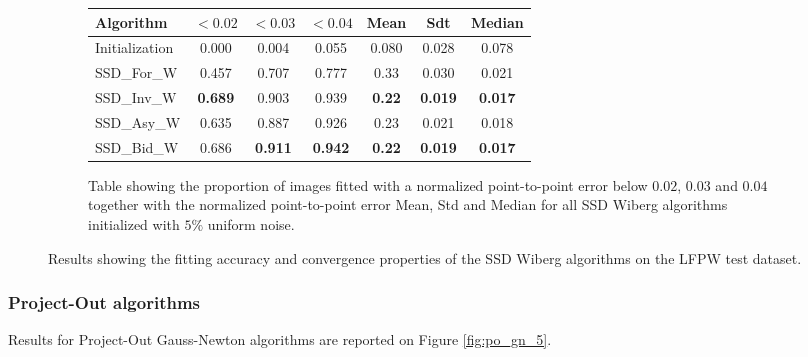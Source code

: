 \begin{figure}[p]
\begin{subfigure}{0.48\textwidth}
	    \label{fig:mean_cost_vs_iters2_ssd_w_5}
	\end{subfigure}
	\par\bigskip\bigskip
	\begin{subfigure}{\textwidth}
		\center
		\begin{tabular}{lcccccc}
		    \toprule
		    Algorithm & $<0.02$ & $<0.03$ & $<0.04$ & Mean & Sdt & Median 
		    \\
		    \midrule
		    Initialization & 0.000 & 0.004 & 0.055 & 0.080 & 0.028 & 0.078
		    \\ 
		    SSD\_For\_W & 0.457 & 0.707 & 0.777 & 0.33 & 0.030 & 0.021
		    \\
		    SSD\_Inv\_W & \textbf{0.689} & 0.903 & 0.939 & \textbf{0.22} & \textbf{0.019} & \textbf{0.017}
		    \\
		    SSD\_Asy\_W & 0.635 & 0.887 & 0.926 & 0.23 & 0.021 & 0.018
		    \\
		    SSD\_Bid\_W & 0.686 & \textbf{0.911} & \textbf{0.942} & \textbf{0.22} & \textbf{0.019} & \textbf{0.017}
		    \\
		    \bottomrule
	  	\end{tabular}
	  	\caption{Table showing the proportion of images fitted with a normalized point-to-point error below $0.02$, $0.03$ and $0.04$ together with the normalized point-to-point error Mean, Std and Median for all SSD Wiberg algorithms initialized with $5\%$ uniform noise.}
	    \label{tab:stats_ssd_w_5}
	\end{subfigure}
	\caption{Results showing the fitting accuracy and convergence properties of the SSD Wiberg algorithms on the LFPW test dataset.}
	\label{fig:ssd_w_5}
\end{figure}


\subsubsection{Project-Out algorithms}

Results for Project-Out Gauss-Newton algorithms are reported on Figure \ref{fig:po_gn_5}.


